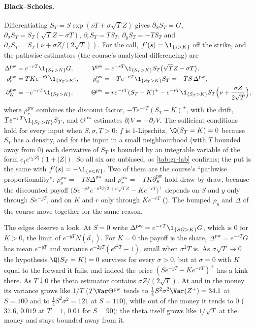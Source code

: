 \paragraph{Black--Scholes.} Differentiating $S_T=S\exp(\nu T+\sigma\sqrt TZ)$ gives
$\partial_SS_T=G$, $\partial_\sigma S_T=S_T(\sqrt TZ-\sigma T)$, $\partial_rS_T=TS_T$,
$\partial_yS_T=-TS_T$ and $\partial_TS_T=S_T(\nu+\sigma Z/(2\sqrt T))$. For the call,
$f'(s)=\1_{\{s>K\}}$ off the strike, and the pathwise estimators (the course's analytical
differencing) are
\begin{equation}\label{eq:gr-pw-bs}
\begin{aligned}
  \Delta^{\mathrm{pw}}&=e^{-rT}\1_{\{S_T>K\}}G, &\quad
  \mathcal V^{\mathrm{pw}}&=e^{-rT}\1_{\{S_T>K\}}S_T\big(\sqrt TZ-\sigma T\big),\\
  \rho_r^{\mathrm{pw}}&=TKe^{-rT}\1_{\{S_T>K\}}, &\quad
  \rho_y^{\mathrm{pw}}&=-Te^{-rT}\1_{\{S_T>K\}}S_T=-TS\,\Delta^{\mathrm{pw}},\\
  \partial_K^{\mathrm{pw}}&=-e^{-rT}\1_{\{S_T>K\}}, &\quad
  \Theta^{\mathrm{pw}}&=re^{-rT}(S_T-K)^+-e^{-rT}\1_{\{S_T>K\}}S_T\Big(\nu+\frac{\sigma Z}{2\sqrt T}\Big),
\end{aligned}
\end{equation}
where $\rho_r^{\mathrm{pw}}$ combines the discount factor, $-Te^{-rT}(S_T-K)^+$, with the drift,
$Te^{-rT}\1_{\{S_T>K\}}S_T$, and $\Theta^{\mathrm{pw}}$ estimates $\partial_tV=-\partial_TV$. The
sufficient conditions hold for every input when $S,\sigma,T>0$: $f$ is $1$-Lipschitz,
$\Q(S_T=K)=0$ because $S_T$ has a density, and for the input in a small neighbourhood (with
$T$ bounded away from $0$) each derivative of $S_T$ is bounded by an integrable variable of the
form $c_1e^{c_2|Z|}(1+|Z|)$.
So all six are unbiased, as \cref{tab:gr-lab} confirms; the put is the same with
$f'(s)=-\1_{\{s<K\}}$. Two of them are the course's ``pathwise proportionality'':
$\rho_y^{\mathrm{pw}}=-TS\Delta^{\mathrm{pw}}$ and $\rho_r^{\mathrm{pw}}=-TK\partial_K^{\mathrm{pw}}$
hold draw by draw, because the discounted payoff
$\big(Se^{-yT}e^{-\sigma^2T/2+\sigma\sqrt TZ}-Ke^{-rT}\big)^+$ depends on $S$ and $y$ only through
$Se^{-yT}$, and on $K$ and $r$ only through $Ke^{-rT}$ (). The bumped
$\rho_y$ and $\Delta$ of the course move together for the same reason.

The edges deserve a look. At $S=0$ write $\Delta^{\mathrm{pw}}=e^{-rT}\1_{\{SG>K\}}G$, which is
$0$ for $K>0$, the limit of $e^{-yT}N(d_+)$. For $K=0$ the payoff is the share,
$\Delta^{\mathrm{pw}}=e^{-rT}G$ has mean $e^{-yT}$ and variance $e^{-2yT}(e^{\sigma^2T}-1)$, small
when $\sigma^2T$ is. As $\sigma\sqrt T\to0$ the hypothesis $\Q(S_T=K)=0$ survives for every
$\sigma>0$, but at $\sigma=0$ with $K$ equal to the forward it fails, and indeed the price
$(Se^{-yT}-Ke^{-rT})^+$ has a kink there. As $T\downarrow0$ the theta estimator contains
$\sigma Z/(2\sqrt T)$. At and in the money its variance grows like $1/T$ ($T\Var\Theta^{\mathrm{pw}}$
tends to $\frac14S^2\sigma^2\Var(Z^+)=34.1$ at $S=100$ and to $\frac14S^2\sigma^2=121$ at $S=110$), while
out of the money it tends to $0$ ($37.6$, $0.019$ at $T=1$, $0.01$ for $S=90$); the theta itself grows
like $1/\sqrt T$ at the money and stays bounded away from it.


